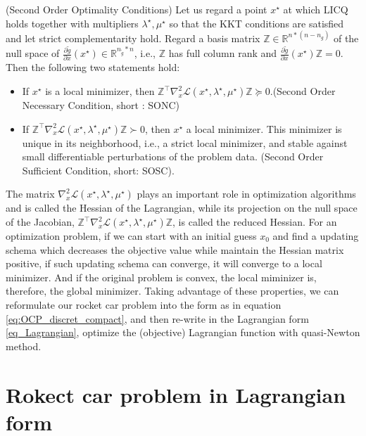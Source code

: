 	\begin{theorem}(Second Order Optimality Conditions) Let us regard a point $x^\star$ at which LICQ holds together with
		multipliers $\lambda^\star, \mu^\star$ so that the KKT conditions are satisfied and let strict complementarity hold. Regard a basis matrix $\mathbb{Z} \in  \mathbb{R}^{n*(n-n_g)}$ of the null space of $\frac{\partial \tilde{g}}{\partial x} (x^\star) \in \mathbb{R}^{n_{\tilde{g}} *n}$, i.e., $\mathbb{Z}$ has full column rank and $\frac{\partial \tilde{g}}{\partial x} (x^\star)\mathbb{Z} =0$. Then the following two statements hold:
	\end{theorem}
	\begin{itemize}
		\item  If $x^\star$ is a local minimizer, then $\mathbb{Z}^\top \nabla_x^2 \mathcal{L}(x^\star, \lambda^\star, \mu^\star)\mathbb{Z} \succeq 0  $.(Second Order Necessary Condition, short : SONC)
		\item  If $\mathbb{Z}^\top \nabla_x^2 \mathcal{L}(x^\star, \lambda^\star, \mu^\star)\mathbb{Z} \succ 0 $, then $x^\star$ a local minimizer. This minimizer is unique in its neighborhood, i.e., a strict local minimizer, and stable against small differentiable perturbations of the problem data. (Second Order Sufficient Condition, short: SOSC).
	\end{itemize}
	
	
	The matrix $\nabla_x^2 \mathcal{L}(x^\star, \lambda^\star, \mu^\star)$ plays an important role in optimization algorithms and is called the Hessian of the Lagrangian, while its projection on the null space of the Jacobian, $\mathbb{Z}^\top \nabla_x^2 \mathcal{L}(x^\star, \lambda^\star, \mu^\star)\mathbb{Z}$, is called the reduced
	Hessian. For an optimization problem, if we can start with an initial guess $x_0$ and find a updating schema which decreases the objective value while maintain the Hessian matrix positive, if such updating schema can converge, it will converge to a local minimizer. And if the original problem is convex, the local miminizer is, therefore, the global minimizer. Taking advantage of these properties, we can reformulate our rocket car problem into the form as in equation \ref{eq:OCP_discret_compact}, and then re-write in the Lagrangian form \ref{eq_Lagrangian}, optimize the (objective) Lagrangian function with quasi-Newton method. 
	
	\section{Rokect car problem in Lagrangian form}
	
